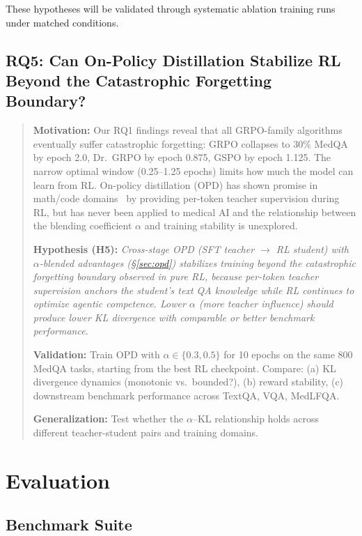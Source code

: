 \documentclass{article}
\begin{document}
These hypotheses will be validated through systematic ablation training runs under matched conditions.

\subsection{RQ5: Can On-Policy Distillation Stabilize RL Beyond the Catastrophic Forgetting Boundary?}
\label{sec:rq5}

\begin{quote}
\textbf{Motivation:} Our RQ1 findings reveal that all GRPO-family algorithms eventually suffer catastrophic forgetting: GRPO collapses to 30\% MedQA by epoch 2.0, Dr.~GRPO by epoch 0.875, GSPO by epoch 1.125. The narrow optimal window (0.25--1.25 epochs) limits how much the model can learn from RL. On-policy distillation (OPD) has shown promise in math/code domains~\citep{gopd2026, glm5, mimo2026} by providing per-token teacher supervision during RL, but has never been applied to medical AI and the relationship between the blending coefficient $\alpha$ and training stability is unexplored.

\textbf{Hypothesis (H5):} \textit{Cross-stage OPD (SFT teacher $\to$ RL student) with $\alpha$-blended advantages (\S\ref{sec:opd}) stabilizes training beyond the catastrophic forgetting boundary observed in pure RL, because per-token teacher supervision anchors the student's text QA knowledge while RL continues to optimize agentic competence. Lower $\alpha$ (more teacher influence) should produce lower KL divergence with comparable or better benchmark performance.}

\textbf{Validation:} Train OPD with $\alpha \in \{0.3, 0.5\}$ for 10 epochs on the same 800 MedQA tasks, starting from the best RL checkpoint. Compare: (a) KL divergence dynamics (monotonic vs.\ bounded?), (b) reward stability, (c) downstream benchmark performance across TextQA, VQA, MedLFQA.

\textbf{Generalization:} Test whether the $\alpha$--KL relationship holds across different teacher-student pairs and training domains.
\end{quote}


\section{Evaluation}
\label{sec:eval}

\subsection{Benchmark Suite}
\end{document}
